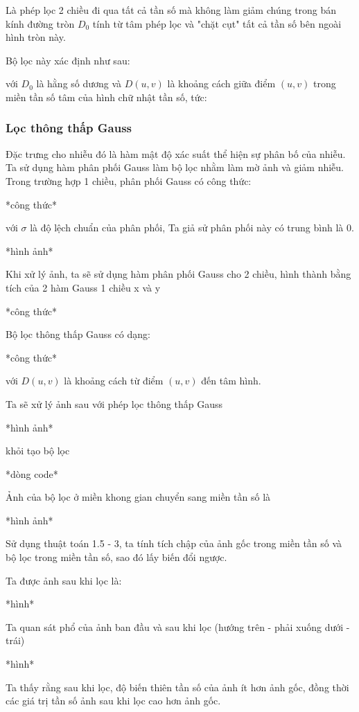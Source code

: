 \documentclass[12pt,a4paper]{report}
\numberwithin{equation}{section}
\theoremstyle{definition} %
\begin{document}
Là phép lọc 2 chiều đi qua tất cả tần số mà không làm giảm chúng trong bán kính đường tròn $D_0$ tính từ tâm phép lọc và "chặt cụt" tất cả tần số bên ngoài hình tròn này.

Bộ lọc này xác định như sau:

với $D_0$ là hằng số dương và $D(u,v)$ là khoảng cách giữa điểm $(u,v)$ trong miền tần số tâm của hình chữ nhật tần số, tức:
\subsubsection{Lọc thông thấp Gauss}

Đặc trưng cho nhiễu đó là hàm mật độ xác suất thể hiện sự phân bố của nhiễu. Ta sử dụng hàm phân phối Gauss làm bộ lọc nhằm làm mờ ảnh và giảm nhiễu. Trong trường hợp 1 chiều, phân phối Gauss có công thức:

*công thức*

với $\sigma$ là độ lệch chuẩn của phân phối, Ta giả sử phân phối này có trung bình là 0.

*hình ảnh*

Khi xử lý ảnh, ta sẽ sử dụng hàm phân phối Gauss cho 2 chiều, hình thành bằng tích của 2 hàm Gauss 1 chiều x và y 

*công thức*

Bộ lọc thông thấp Gauss có dạng:

*công thức*

với $D(u,v)$ là khoảng cách từ điểm $(u,v)$ đến tâm hình.

Ta sẽ xử lý ảnh sau với phép lọc thông thấp Gauss

*hình ảnh*

khỏi tạo bộ lọc

*dòng code*

Ảnh của bộ lọc ở miền khong gian chuyển sang miền tần số là 

*hình ảnh*

Sử dụng thuật toán 1.5 - 3, ta tính tích chập của ảnh gốc trong miền tần số và bộ lọc trong miền tần số, sao đó lấy biến đổi ngược.

Ta được ảnh sau khi lọc là:

*hình*

Ta quan sát phổ của ảnh ban đầu và sau khi lọc (hướng trên - phải xuống dưới - trái)

*hình*

Ta thấy rằng sau khi lọc, độ biến thiên tần số của ảnh ít hơn ảnh gốc, đồng thời các giá trị tần số ảnh sau khi lọc cao hơn ảnh gốc.
\end{document}
